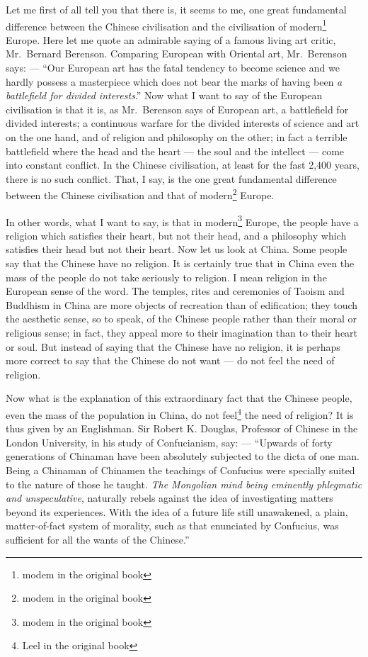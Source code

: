 Let me first of all tell you that there is, it seems to me, one great fundamental difference between the Chinese civilisation and the civilisation of modern\footnote{modem in the original book} Europe.
Here let me quote an admirable saying of a famous living art critic, Mr.~Bernard Berenson.
Comparing European with Oriental art, Mr.~Berenson says: --- ``Our European art has the fatal tendency to become science and we hardly possess a masterpiece which does not bear the marks of having been \emph{a battlefield for divided interests}.''
Now what I want to say of the European civilisation is that it is, as Mr.~Berenson says of European art, a battlefield for divided interests; a continuous warfare for the divided interests of science and art on the one hand, and of religion and philosophy on the other; in fact a terrible battlefield where the head and the heart --- the soul and the intellect --- come into constant conflict.
In the Chinese civilisation, at least for the fast 2,400 years, there is no such conflict.
That, I say, is the one great fundamental difference between the Chinese civilisation and that of modern\footnote{modem in the original book} Europe.

In other words, what I want to say, is that in modern\footnote{modem in the original book} Europe, the people have a religion which satisfies their heart, but not their head, and a philosophy which satisfies their head but not their heart.
Now let us look at China.
Some people say that the Chinese have no religion.
It is certainly true that in China even the mass of the people do not take seriously to religion.
I mean religion in the European sense of the word.
The temples, rites and ceremonies of Taoism and Buddhism in China are more objects of recreation than of edification; they touch the aesthetic sense, so to speak, of the Chinese people rather than their moral or religious sense; in fact, they appeal more to their imagination than to their heart or soul.
But instead of saying that the Chinese have no religion, it is perhaps more correct to say that the Chinese do not want --- do not feel the need of religion.

Now what is the explanation of this extraordinary fact that the Chinese people, even the mass of the population in China, do not feel\footnote{Leel in the original book} the need of religion?
It is thus given by an Englishman. Sir Robert K. Douglas, Professor of Chinese in the London University, in his study of Confucianism, say: --- ``Upwards of forty generations of Chinaman have been absolutely subjected to the dicta of one man. Being a Chinaman of Chinamen the teachings of Confucius were specially suited to the nature of those he taught. \emph{The Mongolian mind being eminently phlegmatic and unspeculative}, naturally rebels against the idea of investigating matters beyond its experiences. With the idea of a future life still unawakened, a plain, matter-of-fact system of morality, such as that enunciated by Confucius, was sufficient for all the wants of the Chinese.''

